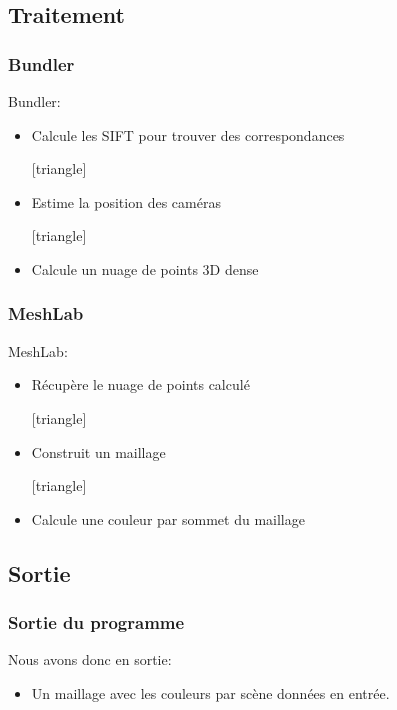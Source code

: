 \documentclass[compress]{beamer} %
\begin{document}
	  \subsection{Traitement}
	  
	  \begin{frame}
	  \frametitle{Bundler}
	   Bundler:
	  \begin{itemize}
	    [triangle]
	    \item Calcule les SIFT pour trouver des correspondances
	    
	    [triangle]
	    \item Estime la position des caméras
	    
	    [triangle]
	    \item Calcule un nuage de points 3D dense
	    \end{itemize}
	  \end{frame}
	  
	  
	  \begin{frame}
	  \frametitle{MeshLab}
	    MeshLab:
	  \begin{itemize}
	    [triangle]
	    \item Récupère le nuage de points calculé
	    
	    [triangle]
	    \item Construit un maillage
	    
	    [triangle]
	    \item Calcule une couleur par sommet du maillage
	    \end{itemize}
	 \end{frame}

	 \subsection{Sortie}
	 \begin{frame}
	  \frametitle{Sortie du programme}
	   Nous avons donc en sortie:
	  \begin{itemize}
	    [triangle]
	    \item Un maillage avec les couleurs par scène données en entrée.
	    
	    
	    \end{itemize}
	 \end{frame}
\end{document}
